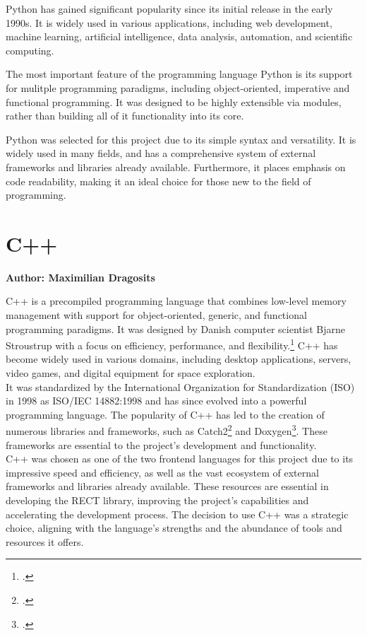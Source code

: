 Python has gained significant popularity since its initial release in the early 1990s. It is widely used in various applications, including web development, machine learning, artificial intelligence, data analysis, automation, and scientific computing. 

The most important feature of the programming language Python is its support for mulitple programming paradigms, including object-oriented, imperative and functional programming. It was designed to be highly extensible via modules, rather than building all of it functionality into its core.

Python was selected for this project due to its simple syntax and versatility. It is widely used in many fields, and has a comprehensive system of external frameworks and libraries already available. Furthermore, it places emphasis on code readability, making it an ideal choice for those new to the field of programming.

\section{C++}
\textbf{Author: Maximilian Dragosits}

C++ is a precompiled programming language that combines low-level memory management with support for object-oriented, generic, and functional programming paradigms. 
It was designed by Danish computer scientist Bjarne Stroustrup with a focus on efficiency, performance, and flexibility.\footcite{lecture_essence_cpp} C++ has 
become widely used in various domains, including desktop applications, servers, video games, and digital equipment for space exploration.\\

It was standardized by the International Organization for Standardization (ISO) in 1998 as ISO/IEC 14882:1998 and has since evolved into a powerful programming 
language. The popularity of C++ has led to the creation of numerous libraries and frameworks, such as Catch2\footcite{catch2_git} and Doxygen\footcite{doxygen_main_site}. 
These frameworks are essential to the project's development and functionality.\\

C++ was chosen as one of the two frontend languages for this project due to its impressive speed and efficiency, as well as the vast ecosystem of external 
frameworks and libraries already available. These resources are essential in developing the RECT library, improving the project's capabilities and accelerating 
the development process. The decision to use C++ was a strategic choice, aligning with the language's strengths and the abundance of tools and resources it 
offers.

